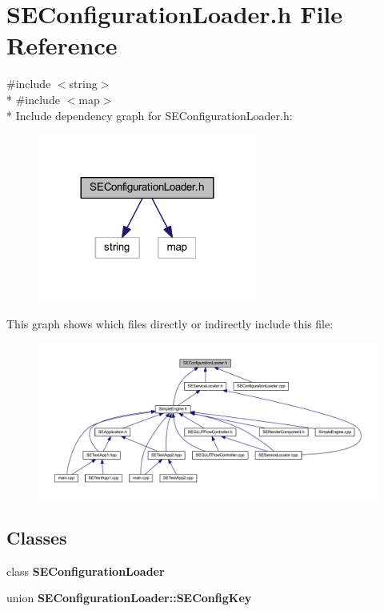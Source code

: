 \section{S\+E\+Configuration\+Loader.\+h File Reference}
\label{_s_e_configuration_loader_8h}
{\ttfamily \#include $<$string$>$}\\*
{\ttfamily \#include $<$map$>$}\\*
Include dependency graph for S\+E\+Configuration\+Loader.\+h\+:
\nopagebreak
\begin{figure}[H]
\begin{center}
\leavevmode
\includegraphics[width=204pt]{_s_e_configuration_loader_8h__incl}
\end{center}
\end{figure}
This graph shows which files directly or indirectly include this file\+:
\nopagebreak
\begin{figure}[H]
\begin{center}
\leavevmode
\includegraphics[width=350pt]{_s_e_configuration_loader_8h__dep__incl}
\end{center}
\end{figure}
\subsection*{Classes}
\begin{DoxyCompactItemize}
\item 
class {\bf S\+E\+Configuration\+Loader}
\item 
union {\bf S\+E\+Configuration\+Loader\+::\+S\+E\+Config\+Key}
\end{DoxyCompactItemize}
